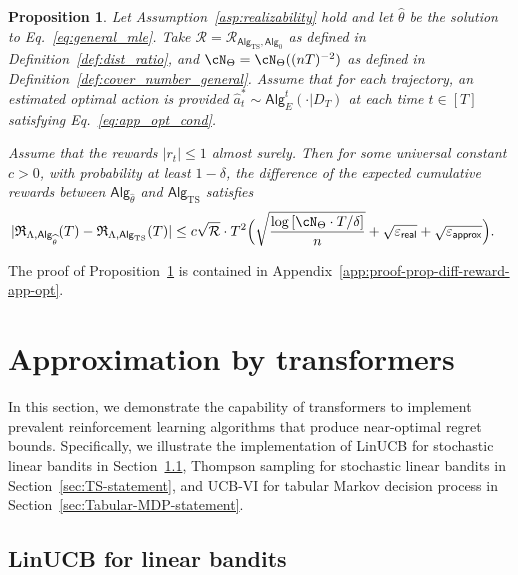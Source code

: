 \documentclass[10pt]{article}
\newtheorem{proposition}[theorem]{Proposition}
\renewcommand{\epsilon}{\varepsilon}
\newcommand{\eps}{\varepsilon}
\newcommand{\<}{\left\langle}
\renewcommand{\>}{\right\rangle}
\newcommand{\brac}[1]{{\left[ #1 \right]}}
\newcommand{\TS}{{\mathrm{TS}}}
\newcommand{\action}{{a}}
\newcommand{\reward}{{r}}
\newcommand{\totlen}{{T}}
\newcommand{\sAlg}{{\mathsf{Alg}}}
\newcommand{\dset}{{D}}
\newcommand{\Numobs}{{n}}
\newcommand{\Parspace}{{\Theta}}
\newcommand{\appeps}{\eps_{{\mathsf{approx}}}}
\newcommand{\EstPar}{{\widehat{\theta}}}
\newcommand{\prior}{{\Lambda}}
\newcommand{\shortexp}{{E}}
\newcommand{\geneps}{{\epsilon}_{\sf real}}
\newcommand{\totreward}{{\mathfrak{R}}}
\newcommand{\distratio}{{\mathcal{R}}}
\begin{document}
\begin{proposition}\label{prop:app_opt_diff_reward} Let Assumption~\ref{asp:realizability} hold and let $\EstPar$ be the solution to Eq.~\eqref{eq:general_mle}. Take $\distratio = \distratio_{\sAlg_\TS,\sAlg_0}$ as defined in Definition~\ref{def:dist_ratio}, and $\cN_{\Parspace} = \cN_{\Parspace}((\Numobs\totlen)^{-2})$  as defined in Definition~\ref{def:cover_number_general}. Assume that for each trajectory, an estimated optimal action is provided $\widehat\action_t^* \sim \sAlg_{\shortexp}^t(\cdot | \dset_\totlen)$ at each time $t\in[\totlen]$ satisfying Eq.~\eqref{eq:app_opt_cond}.







Assume that the rewards $|\reward_t|\leq 1$  almost surely. Then for some universal constant $c>0$, with probability at least $1-\delta$, the difference of the expected cumulative rewards between $\sAlg_\EstPar$ and $\sAlg_\TS$ satisfies
\begin{align*}
|\totreward_{\prior,\sAlg_\EstPar}(\totlen)-\totreward_{\prior,\sAlg_\TS}(\totlen)|
&\leq
c \sqrt{\distratio}\cdot\totlen^2 \Big( \sqrt{\frac{\log \brac{ \cN_{\Parspace} \cdot \totlen/\delta } }{n} } + \sqrt{\geneps} + \sqrt{\appeps} \Big).
\end{align*}
\end{proposition}
The proof of Proposition~\ref{prop:app_opt_diff_reward} is contained in Appendix~\ref{app:proof-prop-diff-reward-app-opt}.







\section{Approximation by transformers}\label{sec:ICRL}

In this section, we demonstrate the capability of transformers to implement prevalent reinforcement learning algorithms that produce near-optimal regret bounds. Specifically, we illustrate the implementation of LinUCB for stochastic linear bandits in Section~\ref{sec:LinUCB-statement}, Thompson sampling for stochastic linear bandits in Section~\ref{sec:TS-statement}, and UCB-VI for tabular Markov decision process in Section~\ref{sec:Tabular-MDP-statement}.

\subsection{LinUCB for linear bandits}\label{sec:LinUCB-statement}
\end{document}
